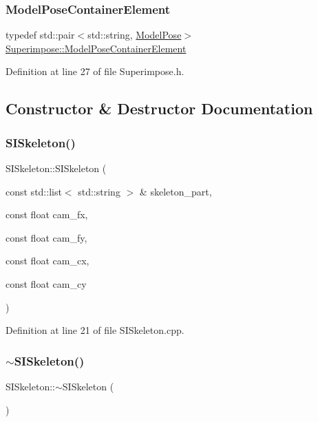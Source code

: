 \subsubsection{\texorpdfstring{Model\+Pose\+Container\+Element}{ModelPoseContainerElement}}
{\footnotesize\ttfamily typedef std\+::pair$<$std\+::string, \mbox{\hyperlink{classSuperimpose_a85d40a5caf19f486d1e0c15c0a025378}{Model\+Pose}}$>$ \mbox{\hyperlink{classSuperimpose_a1e02e0225687b42296dcfee4eadf8a55}{Superimpose\+::\+Model\+Pose\+Container\+Element}}\hspace{0.3cm}{\ttfamily [inherited]}}



Definition at line 27 of file Superimpose.\+h.



\subsection{Constructor \& Destructor Documentation}
\mbox{\label{classSISkeleton_a9d7925269e60716f5eba550ee6d5a148}} 
\subsubsection{\texorpdfstring{S\+I\+Skeleton()}{SISkeleton()}}
{\footnotesize\ttfamily S\+I\+Skeleton\+::\+S\+I\+Skeleton (\begin{DoxyParamCaption}\item[{const std\+::list$<$ std\+::string $>$ \&}]{skeleton\+\_\+part,  }\item[{const float}]{cam\+\_\+fx,  }\item[{const float}]{cam\+\_\+fy,  }\item[{const float}]{cam\+\_\+cx,  }\item[{const float}]{cam\+\_\+cy }\end{DoxyParamCaption})}



Definition at line 21 of file S\+I\+Skeleton.\+cpp.

\mbox{\label{classSISkeleton_a6e9f780999700a4695d4ed487f2499b9}} 
\subsubsection{\texorpdfstring{$\sim$\+S\+I\+Skeleton()}{~SISkeleton()}}
{\footnotesize\ttfamily S\+I\+Skeleton\+::$\sim$\+S\+I\+Skeleton (\begin{DoxyParamCaption}{ }\end{DoxyParamCaption})}



